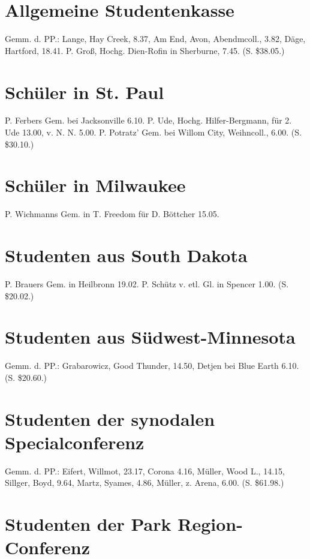 \section{Allgemeine Studentenkasse}

Gemm. d. PP.: Lange, Hay Creek, 8.37, Am End, Avon, Abendmcoll., 3.82, Däge, Hartford, 18.41. P. Groß, Hochg. Dien-Rofin in Sherburne, 7.45. (S. \$38.05.)

\section{Schüler in St. Paul}

P. Ferbers Gem. bei Jacksonville 6.10. P. Ude, Hochg. Hilfer-Bergmann, für 2. Ude 13.00, v. N. N. 5.00. P. Potratz’ Gem. bei Willom City, Weihncoll., 6.00. (S. \$30.10.)

\section{Schüler in Milwaukee}

P. Wichmanns Gem. in T. Freedom für D. Böttcher 15.05.

\section{Studenten aus South Dakota}

P. Brauers Gem. in Heilbronn 19.02. P. Schütz v. etl. Gl. in Spencer 1.00. (S. \$20.02.)

\section{Studenten aus Südwest-Minnesota}

Gemm. d. PP.: Grabarowicz, Good Thunder, 14.50, Detjen bei Blue Earth 6.10. (S. \$20.60.)

\section{Studenten der synodalen Specialconferenz}

Gemm. d. PP.: Eifert, Willmot, 23.17, Corona 4.16, Müller, Wood L., 14.15, Sillger, Boyd, 9.64, Martz, Syames, 4.86, Müller, z. Arena, 6.00. (S. \$61.98.)

\section{Studenten der Park Region-Conferenz}

